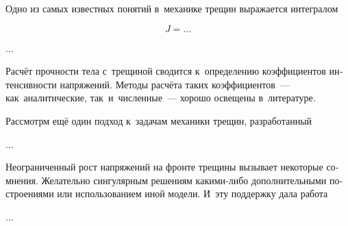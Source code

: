 
\begin{otherlanguage}{russian}

Одно из самых известных понятий в~механике трещин выражается интегралом

\nopagebreak\vspace{-0.2em}\begin{equation}
J = \ldots
\end{equation}

...



\end{otherlanguage}



\begin{otherlanguage}{russian}

Расчёт прочности тела с~трещиной сводится к~определению коэффициентов интенсивности напряжений. Методы расчёта таких коэффициентов~--- как~аналитические, так~и~численные~--- хорошо освещены в~литературе.

Рассмотрм ещё один подход к~задачам механики трещин, разработанный

...



\end{otherlanguage}




\begin{otherlanguage}{russian}

Неограниченный рост напряжений на фронте трещины вызывает некоторые сомнения. Желательно  сингулярным решениям какими\hbox{-}либо дополнительными построениями или использованием иной модели. И~эту поддержку дала работа

...



\end{otherlanguage}

